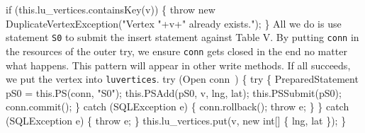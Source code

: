 \nwendcode{}
\nwenddocs{}\plusendmoddef
  if (this.lu_vertices.containsKey(v)) \{
    throw new DuplicateVertexException("Vertex "+v+" already exists.");
  \}
\nwendcode{}\nwdocspar
{\small All we do is use statement {\tt{}\protect{}S0} to submit the insert statement
against Table V. By putting {\tt{}conn} in the resources of the outer try, we
ensure {\tt{}conn} gets closed in the end no matter what happens. This pattern
will appear in other write methods. If all succeeds, we put the vertex into
{\tt{}lu{}vertices}.}
\nwenddocs{}\plusendmoddef
  try (\LA{}Open \code{}conn\edoc{}~{\nwtagstyle{}}\RA{}) \{
    try \{
      PreparedStatement pS0 = this.PS(conn, "S0");
      this.PSAdd(pS0, v, lng, lat);
      this.PSSubmit(pS0);
      conn.commit();
    \} catch (SQLException e) \{
      conn.rollback();
      throw e;
    \}
  \} catch (SQLException e) \{
    throw e;
  \}
  this.lu_vertices.put(v, new int[] \{ lng, lat \});
\}
\nwendcode{}\nwdocspar

